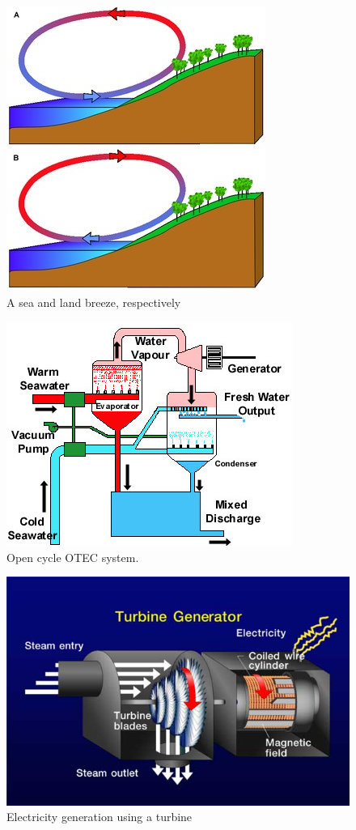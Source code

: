 \documentclass{article}
\begin{document}
\begin{multicols}{2}
\setlength{\premulticols}{1pt}
\setlength{\postmulticols}{1pt}
\setlength{\multicolsep}{1pt}
\setlength{\columnsep}{2pt}


\begin{figure}[H]
\centering
	\includegraphics[scale=0.4]{./Images/BC4_LSBreeze.jpg}
	\caption{A sea and land breeze, respectively}
\end{figure}
\begin{figure}[H]
\centering
	\includegraphics[scale=0.51]{./Images/BC4_OTEC.jpg}
	\caption{Open cycle OTEC system.}
\end{figure}
\end{multicols}

\begin{figure}[H]
\centering
	\includegraphics[scale=0.5]{./Images/BC4_Turbine.jpg}
	\caption{Electricity generation using a turbine}
\end{figure}
\end{document}
